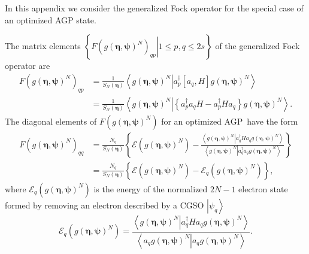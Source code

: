\documentclass[titlepage]{article}%
\begin{document}
In this appendix we consider the generalized Fock operator for the special
case of an optimized AGP state.

The matrix elements $\left\{  \left.  F\left(  g\left(  \bm{\eta
},\bm{\psi}\right)  ^{N}\right)  _{qp}\right\vert 1\leq p,q\leq2s\right\}  $
of the generalized Fock operator are
\begin{align}
F\left(  g\left(  \bm{\eta},\bm{\psi}\right)  ^{N}\right)  _{qp}  &  =\frac
{1}{S_{N}\left(  \bm{\eta}\right)  }\left\langle \left.  g\left(
\bm{\eta},\bm{\psi}\right)  ^{N}\right\vert a_{p}^{\dagger}\left[
a_{q},H\right]  g\left(  \bm{\eta},\bm{\psi}\right)  ^{N}\right\rangle
\nonumber\\
&  =\frac{1}{S_{N}\left(  \bm{\eta}\right)  }\left\langle \left.  g\left(
\bm{\eta},\bm{\psi}\right)  ^{N}\right\vert \left\{  a_{p}^{\dagger}%
a_{q}H-a_{p}^{\dagger}Ha_{q}\right\}  g\left(  \bm{\eta},\bm{\psi }\right)
^{N}\right\rangle .
\end{align}
The diagonal elements of $F\left(  g\left(  \bm{\eta},\bm{\psi
}\right)  ^{N}\right)  $ for an optimized AGP\ have the form
\begin{align}
F\left(  g\left(  \bm{\eta},\bm{\psi}\right)  ^{N}\right)  _{qq}  &
=\frac{N_{q}}{S_{N}\left(  \bm{\eta}\right)  }\left\{  \mathcal{E}\left(
g\left(  \bm{\eta},\bm{\psi}\right)  ^{N}\right)  -\frac{\left\langle \left.
g\left(  \bm{\eta},\bm{\psi}\right)  ^{N}\right\vert a_{q}^{\dagger}%
Ha_{q}g\left(  \bm{\eta},\bm{\psi}\right)  ^{N}\right\rangle }{\left\langle
\left.  g\left(  \bm{\eta},\bm{\psi }\right)  ^{N}\right\vert a_{q}^{\dagger
}a_{q}g\left(  \bm{\eta },\bm{\psi}\right)  ^{N}\right\rangle }\right\}
\nonumber\\
&  =\frac{N_{q}}{S_{N}\left(  \bm{\eta}\right)  }\left\{  \mathcal{E}\left(
g\left(  \bm{\eta},\bm{\psi}\right)  ^{N}\right)  -\mathcal{E}_{q}\left(
g\left(  \bm{\eta},\bm{\psi}\right)  ^{N}\right)  \right\}  ,
\end{align}
where $\mathcal{E}_{q}\left(  g\left(  \bm{\eta},\bm{\psi}\right)
^{N}\right)  $ is the energy of the normalized $2N-1$ electron state formed by
removing an electron described by a CGSO $\left\vert \psi_{q}\right\rangle $
\begin{equation}
\mathcal{E}_{q}\left(  g\left(  \bm{\eta},\bm{\psi}\right)  ^{N}\right)
=\frac{\left\langle \left.  g\left(  \bm{\eta},\bm{\psi }\right)
^{N}\right\vert a_{q}^{\dagger}Ha_{q}g\left(  \bm{\eta },\bm{\psi}\right)
^{N}\right\rangle }{\left\langle \left.  a_{q}g\left(
\bm{\eta},\bm{\psi}\right)  ^{N}\right\vert a_{q}g\left(
\bm{\eta},\bm{\psi}\right)  ^{N}\right\rangle }.
\end{equation}
\end{document}
